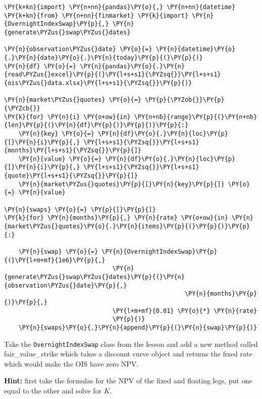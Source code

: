 \begin{Answer}
\begin{tcolorbox}[size=fbox, boxrule=1pt, colback=cellbackground, colframe=cellborder]
\begin{Verbatim}[commandchars=\\\{\}]
\PY{k+kn}{import} \PY{n+nn}{pandas}\PY{o}{,} \PY{n+nn}{datetime}
\PY{k+kn}{from} \PY{n+nn}{finmarket} \PY{k}{import} \PY{n}{OvernightIndexSwap}\PY{p}{,} \PY{n}{generate\PYZus{}swap\PYZus{}dates}

\PY{n}{observation\PYZus{}date} \PY{o}{=} \PY{n}{datetime}\PY{o}{.}\PY{n}{date}\PY{o}{.}\PY{n}{today}\PY{p}{(}\PY{p}{)}
\PY{n}{df} \PY{o}{=} \PY{n}{pandas}\PY{o}{.}\PY{n}{read\PYZus{}excel}\PY{p}{(}\PY{l+s+s1}{\PYZsq{}}\PY{l+s+s1}{ois\PYZus{}data.xlsx}\PY{l+s+s1}{\PYZsq{}}\PY{p}{)}

\PY{n}{market\PYZus{}quotes} \PY{o}{=} \PY{p}{\PYZob{}}\PY{p}{\PYZcb{}}
\PY{k}{for} \PY{n}{i} \PY{o+ow}{in} \PY{n+nb}{range}\PY{p}{(}\PY{n+nb}{len}\PY{p}{(}\PY{n}{df}\PY{p}{)}\PY{p}{)}\PY{p}{:}
    \PY{n}{key} \PY{o}{=} \PY{n}{df}\PY{o}{.}\PY{n}{loc}\PY{p}{[}\PY{n}{i}\PY{p}{,} \PY{l+s+s1}{\PYZsq{}}\PY{l+s+s1}{months}\PY{l+s+s1}{\PYZsq{}}\PY{p}{]}
    \PY{n}{value} \PY{o}{=} \PY{n}{df}\PY{o}{.}\PY{n}{loc}\PY{p}{[}\PY{n}{i}\PY{p}{,} \PY{l+s+s1}{\PYZsq{}}\PY{l+s+s1}{quote}\PY{l+s+s1}{\PYZsq{}}\PY{p}{]}
    \PY{n}{market\PYZus{}quotes}\PY{p}{[}\PY{n}{key}\PY{p}{]} \PY{o}{=} \PY{n}{value}

\PY{n}{swaps} \PY{o}{=} \PY{p}{[}\PY{p}{]}
\PY{k}{for} \PY{n}{months}\PY{p}{,} \PY{n}{rate} \PY{o+ow}{in} \PY{n}{market\PYZus{}quotes}\PY{o}{.}\PY{n}{items}\PY{p}{(}\PY{p}{)}\PY{p}{:}
        
    \PY{n}{swap} \PY{o}{=} \PY{n}{OvernightIndexSwap}\PY{p}{(}\PY{l+m+mf}{1e6}\PY{p}{,}
                              \PY{n}{generate\PYZus{}swap\PYZus{}dates}\PY{p}{(}\PY{n}{observation\PYZus{}date}\PY{p}{,}
                                                  \PY{n}{months}\PY{p}{)}\PY{p}{,}
                              \PY{l+m+mf}{0.01} \PY{o}{*} \PY{n}{rate}
                              \PY{p}{)}
    \PY{n}{swaps}\PY{o}{.}\PY{n}{append}\PY{p}{(}\PY{n}{swap}\PY{p}{)}
\end{Verbatim}
\end{tcolorbox}
\end{Answer}

\begin{Exercise}[title={(OvernightIndexSwap fair value)}]
Take the \texttt{OvernightIndexSwap} class from the lesson and add a new method called fair\_value\_strike which takes a discount curve object and returns the fixed rate which would make the OIS have zero NPV.

\textbf{Hint:} first take the formulas for the NPV of the fixed and floating legs, put one equal to the other and solve for $K$.
\end{Exercise}

